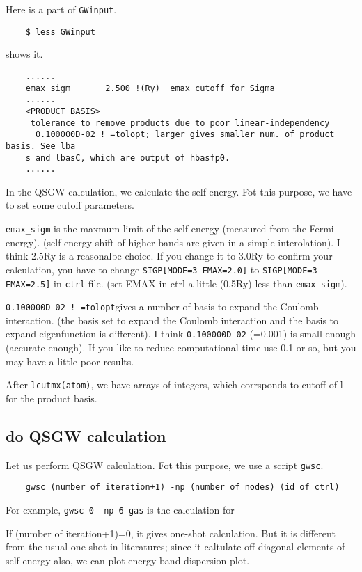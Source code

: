 \documentclass[a4paper,10pt,epsf,fleqn]{article}
\begin{document}
Here is a part of \verb+GWinput+.
\begin{verbatim}
    $ less GWinput
\end{verbatim}
shows it.
\begin{verbatim}
    ......
    emax_sigm       2.500 !(Ry)  emax cutoff for Sigma
    ......
    <PRODUCT_BASIS> 
     tolerance to remove products due to poor linear-independency
      0.100000D-02 ! =tolopt; larger gives smaller num. of product basis. See lba
    s and lbasC, which are output of hbasfp0.
    ......
\end{verbatim}

In the QSGW calculation, we calculate the self-energy.
Fot this purpose, we have to set some cutoff parameters.

\verb+emax_sigm+ is the maxmum limit of the self-energy (measured from
the Fermi energy). (self-energy shift of higher bands are given in a
simple interolation). I think 2.5Ry is a reasonalbe choice.
If you change it to 3.0Ry to confirm your calculation, 
you have to change \verb+SIGP[MODE=3 EMAX=2.0]+
to \verb+SIGP[MODE=3 EMAX=2.5]+ in \verb+ctrl+ file.
(set EMAX in ctrl a little (0.5Ry) less than \verb+emax_sigm+).

\verb+0.100000D-02 ! =tolopt+gives a number of basis
to expand the Coulomb interaction. (the basis set to expand the
Coulomb interaction and the basis to expand eigenfunction is different).
I think \verb+0.100000D-02+ (=0.001) is small enough (accurate enough).
If you like to reduce computational time use 0.1 or so, but you may
have a little poor results.

After \verb+lcutmx(atom)+, we have arrays of integers, which
corrsponds to cutoff of l for the product basis.

\subsection{do QSGW calculation}
\label{fpgw-calc}
Let us perform QSGW calculation. 
Fot this purpose, we use a script \verb+gwsc+. 
\begin{verbatim}
    gwsc (number of iteration+1) -np (number of nodes) (id of ctrl)
\end{verbatim}
For example, \verb+gwsc 0 -np 6 gas+ is the calculation for 

If (number of iteration+1)=0, it gives one-shot calculation.
But it is different from the usual one-shot in literatures;
since it caltulate off-diagonal elements of self-energy also,
we can plot energy band dispersion plot. 
\end{document}

